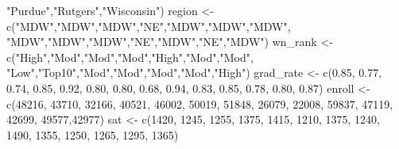 \documentclass[
]{article}
\newenvironment{Shaded}{\begin{snugshade}}{\end{snugshade}}
\newcommand{\DecValTok}[1]{\textcolor[rgb]{0.00,0.00,0.81}{#1}}
\newcommand{\FloatTok}[1]{\textcolor[rgb]{0.00,0.00,0.81}{#1}}
\newcommand{\FunctionTok}[1]{\textcolor[rgb]{0.00,0.00,0.00}{#1}}
\newcommand{\NormalTok}[1]{#1}
\newcommand{\OtherTok}[1]{\textcolor[rgb]{0.56,0.35,0.01}{#1}}
\newcommand{\StringTok}[1]{\textcolor[rgb]{0.31,0.60,0.02}{#1}}
\begin{document}
\begin{Shaded}
\begin{Highlighting}[]
            \StringTok{"Purdue"}\NormalTok{,}\StringTok{"Rutgers"}\NormalTok{,}\StringTok{"Wisconsin"}\NormalTok{)}
\NormalTok{region }\OtherTok{\textless{}{-}} \FunctionTok{c}\NormalTok{(}\StringTok{"MDW"}\NormalTok{,}\StringTok{"MDW"}\NormalTok{,}\StringTok{"MDW"}\NormalTok{,}\StringTok{"NE"}\NormalTok{,}\StringTok{"MDW"}\NormalTok{,}\StringTok{"MDW"}\NormalTok{,}\StringTok{"MDW"}\NormalTok{,}
            \StringTok{"MDW"}\NormalTok{,}\StringTok{"MDW"}\NormalTok{,}\StringTok{"MDW"}\NormalTok{,}\StringTok{"NE"}\NormalTok{,}\StringTok{"MDW"}\NormalTok{,}\StringTok{"NE"}\NormalTok{,}\StringTok{"MDW"}\NormalTok{)}
\NormalTok{wn\_rank }\OtherTok{\textless{}{-}} \FunctionTok{c}\NormalTok{(}\StringTok{"High"}\NormalTok{,}\StringTok{"Mod"}\NormalTok{,}\StringTok{"Mod"}\NormalTok{,}\StringTok{"Mod"}\NormalTok{,}\StringTok{"High"}\NormalTok{,}\StringTok{"Mod"}\NormalTok{,}\StringTok{"Mod"}\NormalTok{,}
             \StringTok{"Low"}\NormalTok{,}\StringTok{"Top10"}\NormalTok{,}\StringTok{"Mod"}\NormalTok{,}\StringTok{"Mod"}\NormalTok{,}\StringTok{"Mod"}\NormalTok{,}\StringTok{"Mod"}\NormalTok{,}\StringTok{"High"}\NormalTok{)}
\NormalTok{grad\_rate }\OtherTok{\textless{}{-}} \FunctionTok{c}\NormalTok{(}\FloatTok{0.85}\NormalTok{, }\FloatTok{0.77}\NormalTok{, }\FloatTok{0.74}\NormalTok{, }\FloatTok{0.85}\NormalTok{, }\FloatTok{0.92}\NormalTok{, }\FloatTok{0.80}\NormalTok{, }\FloatTok{0.80}\NormalTok{, }
               \FloatTok{0.68}\NormalTok{, }\FloatTok{0.94}\NormalTok{, }\FloatTok{0.83}\NormalTok{, }\FloatTok{0.85}\NormalTok{, }\FloatTok{0.78}\NormalTok{, }\FloatTok{0.80}\NormalTok{, }\FloatTok{0.87}\NormalTok{)}
\NormalTok{enroll }\OtherTok{\textless{}{-}} \FunctionTok{c}\NormalTok{(}\DecValTok{48216}\NormalTok{, }\DecValTok{43710}\NormalTok{, }\DecValTok{32166}\NormalTok{, }\DecValTok{40521}\NormalTok{, }\DecValTok{46002}\NormalTok{, }\DecValTok{50019}\NormalTok{, }\DecValTok{51848}\NormalTok{,}
            \DecValTok{26079}\NormalTok{, }\DecValTok{22008}\NormalTok{, }\DecValTok{59837}\NormalTok{, }\DecValTok{47119}\NormalTok{, }\DecValTok{42699}\NormalTok{, }\DecValTok{49577}\NormalTok{,}\DecValTok{42977}\NormalTok{)}
\NormalTok{sat }\OtherTok{\textless{}{-}} \FunctionTok{c}\NormalTok{(}\DecValTok{1420}\NormalTok{, }\DecValTok{1245}\NormalTok{, }\DecValTok{1255}\NormalTok{, }\DecValTok{1375}\NormalTok{, }\DecValTok{1415}\NormalTok{, }\DecValTok{1210}\NormalTok{, }\DecValTok{1375}\NormalTok{,}
         \DecValTok{1240}\NormalTok{, }\DecValTok{1490}\NormalTok{, }\DecValTok{1355}\NormalTok{, }\DecValTok{1250}\NormalTok{, }\DecValTok{1265}\NormalTok{, }\DecValTok{1295}\NormalTok{, }\DecValTok{1365}\NormalTok{)}

\end{Highlighting}
\end{Shaded}
\end{document}
